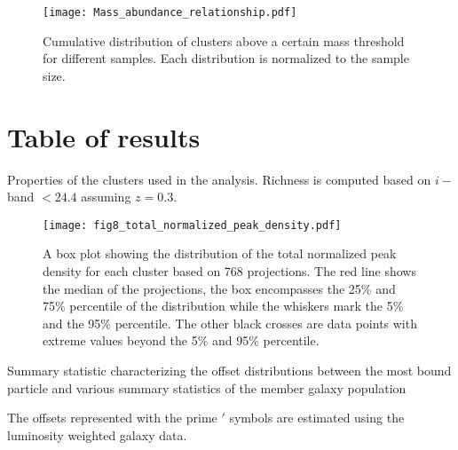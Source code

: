 \begin{figure*}
	\begin{center}
	\texttt{[image: Mass\_abundance\_relationship.pdf]}
	\caption{Cumulative distribution of clusters above a certain mass threshold
		for different samples.
		Each distribution is normalized to the sample size.
		\label{fig:mass_abundance_distribution}
	}
\end{center}
\end{figure*}
 

\section{Table of results}
\label{app:table_of_results}
\begin{landscape}
\begin{table}
	\begin{center}
	\caption{Properties of the clusters used in the analysis. Richness is
	computed based on $i-$band $< 24.4$ assuming $z=0.3$.\label{tab:cluster_prop}}
	
\end{center}
\end{table}
\end{landscape}

\begin{figure*}
	\begin{center}
	\texttt{[image: fig8\_total\_normalized\_peak\_density.pdf]}
	\caption{A box plot showing the distribution of the total normalized peak density 
		for each cluster 
		based on 768 projections. The red line shows the median of the projections,
		the box encompasses the 25\% and 75\% percentile of the distribution while
		the whiskers mark the 5\% and the 95\% percentile. The other black crosses
		are data points with extreme values beyond the 5\% and 95\% percentile.
		\label{fig:total_peak_dens_distribution}
	}
\end{center}
\end{figure*}


\begin{table*}
	\begin{center}
	\caption{Summary statistic characterizing the offset distributions
		between the most bound particle and various summary statistics of 
		the member galaxy population
	\label{tab:most_bound_particle_offset_distributions}}
	
\end{center}
\small{The offsets represented with the prime $'$ symbols are estimated using the luminosity weighted galaxy 
data.}
\end{table*}


